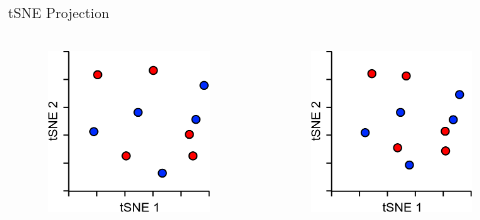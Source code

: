 \begin{frame}[allowframebreaks]{tSNE Projection}
    \begin{columns}
    \begin{column}{0.2\textwidth}
        \begin{figure}
            \centering
            \includegraphics[width=1\textwidth,keepaspectratio]{images/dul/dim-reduce/slide_31_1_img.png}
        \end{figure}
    \end{column}
    \begin{column}{0.2\textwidth}
        \begin{figure}
            \centering
            \includegraphics[width=1\textwidth,keepaspectratio]{images/dul/dim-reduce/slide_31_2_img.png}

\end{figure}
\end{column}
\end{columns}
\end{frame}
